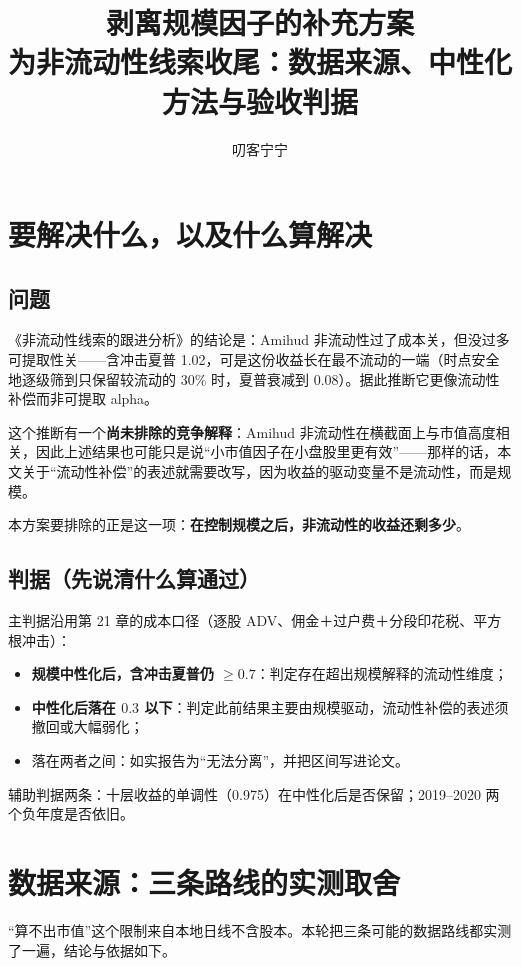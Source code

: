 \documentclass[11pt,a4paper]{ctexart}
\title{\bfseries 剥离规模因子的补充方案\\\large 为非流动性线索收尾：数据来源、中性化方法与验收判据}
\author{\large 叨客宁宁}
\date{}
\begin{document}
\maketitle

\section{要解决什么，以及什么算解决}

\subsection{问题}

《非流动性线索的跟进分析》的结论是：Amihud 非流动性过了成本关，但没过多可提取性关——含冲击夏普 1.02，可是这份收益长在最不流动的一端（时点安全地逐级筛到只保留较流动的 30\% 时，夏普衰减到 0.08）。据此推断它更像流动性补偿而非可提取 alpha。

这个推断有一个\textbf{尚未排除的竞争解释}：Amihud 非流动性在横截面上与市值高度相关，因此上述结果也可能只是说“小市值因子在小盘股里更有效”——那样的话，本文关于“流动性补偿”的表述就需要改写，因为收益的驱动变量不是流动性，而是规模。

本方案要排除的正是这一项：\textbf{在控制规模之后，非流动性的收益还剩多少}。

\subsection{判据（先说清什么算通过）}

主判据沿用第 21 章的成本口径（逐股 ADV、佣金＋过户费＋分段印花税、平方根冲击）：

\begin{itemize}
  \item \textbf{规模中性化后，含冲击夏普仍 $\geq 0.7$}：判定存在超出规模解释的流动性维度；
  \item \textbf{中性化后落在 $0.3$ 以下}：判定此前结果主要由规模驱动，流动性补偿的表述须撤回或大幅弱化；
  \item 落在两者之间：如实报告为“无法分离”，并把区间写进论文。
\end{itemize}

辅助判据两条：十层收益的单调性（0.975）在中性化后是否保留；2019--2020 两个负年度是否依旧。

\section{数据来源：三条路线的实测取舍}

“算不出市值”这个限制来自本地日线不含股本。本轮把三条可能的数据路线都实测了一遍，结论与依据如下。
\end{document}
